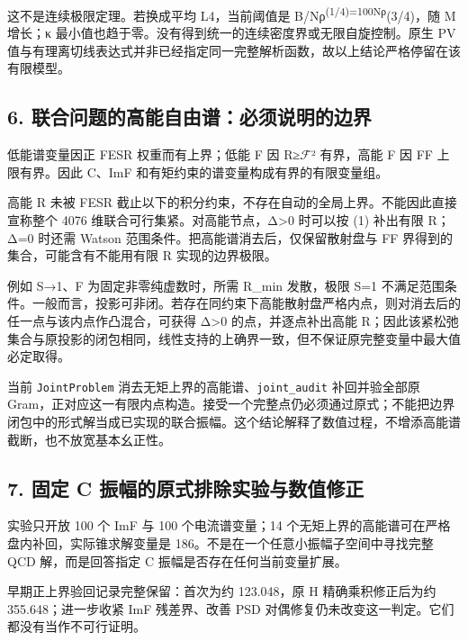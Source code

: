 \documentclass[
  11pt,
  a4paper,
]{article}
\begin{document}
这不是连续极限定理。若换成平均 L4，当前阈值是
B/Nρ\textsuperscript{(1/4)=100Nρ}(3/4)，随 M 增长；κ
最小值也趋于零。没有得到统一的连续密度界或无限自旋控制。原生 PV
值与有理离切线表达式并非已经指定同一完整解析函数，故以上结论严格停留在该有限模型。

\subsection{6.
联合问题的高能自由谱：必须说明的边界}\label{ux8054ux5408ux95eeux9898ux7684ux9ad8ux80fdux81eaux7531ux8c31ux5fc5ux987bux8bf4ux660eux7684ux8fb9ux754c}

低能谱变量因正 FESR 权重而有上界；低能 F 因
R≥\textbar{}\(\mathcal F\)\textbar² 有界，高能 F 因 FF 上限有界。因此
C、ImF 和有矩约束的谱变量构成有界的有限变量组。

高能 R 未被 FESR
截止以下的积分约束，不存在自动的全局上界。不能因此直接宣称整个 4076
维联合可行集紧。对高能节点，Δ\textgreater0 时可以按 (1) 补出有限 R；Δ=0
时还需 Watson 范围条件。把高能谱消去后，仅保留散射盘与 FF
界得到的集合，可能含有不能用有限 R 实现的边界极限。

例如 S→1、F 为固定非零纯虚数时，所需 R\_min 发散，极限 S=1
不满足范围条件。一般而言，投影可非闭。若存在同约束下高能散射盘严格内点，则对消去后的任一点与该内点作凸混合，可获得
Δ\textgreater0 的点，并逐点补出高能
R；因此该紧松弛集合与原投影的闭包相同，线性支持的上确界一致，但不保证原完整变量中最大值必定取得。

当前 \texttt{JointProblem} 消去无矩上界的高能谱、\texttt{joint\_audit}
补回并验全部原
Gram，正对应这一有限内点构造。接受一个完整点仍必须通过原式；不能把边界闭包中的形式解当成已实现的联合振幅。这个结论解释了数值过程，不增添高能谱截断，也不放宽基本幺正性。

\subsection{7. 固定 C
振幅的原式排除实验与数值修正}\label{ux56faux5b9a-c-ux632fux5e45ux7684ux539fux5f0fux6392ux9664ux5b9eux9a8cux4e0eux6570ux503cux4feeux6b63}

实验只开放 100 个 ImF 与 100 个电流谱变量；14
个无矩上界的高能谱可在严格盘内补回，实际锥求解变量是
186。不是在一个任意小振幅子空间中寻找完整 QCD 解，而是回答指定 C
振幅是否存在任何当前变量扩展。

早期正上界验回记录完整保留：首次为约 123.048，原 H 精确乘积修正后为约
355.648；进一步收紧 ImF 残差界、改善 PSD
对偶修复仍未改变这一判定。它们都没有当作不可行证明。
\end{document}
